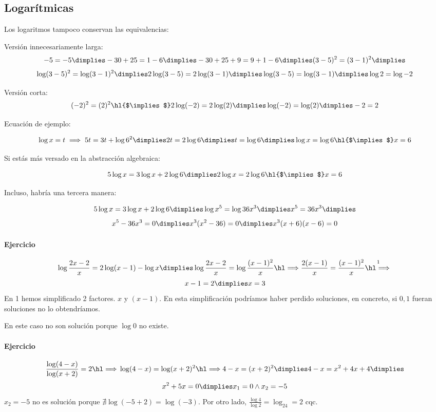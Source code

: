 \subsection{Logarítmicas}

Los logaritmos tampoco conservan las equivalencias:

Versión innecesariamente larga:
\[
	-5 = -5 \dimplies -30+25 = 1-6 \dimplies -30+25+9 = 9+1-6 \dimplies (3-5)^2 = (3-1)^2 \dimplies 
\]
\[
	\log(3-5)^2 = \log(3-1)^2 \dimplies 2\log(3-5) = 2\log(3-1) \dimplies \log(3-5)=\log(3-1) \dimplies \log2=\log-2
\]

Versión corta:
\[
	(-2)^2 = (2)^2 \text{\hl{$\implies$}} 2\log(-2) = 2\log(2) \dimplies \log(-2) = \log(2) \dimplies -2=2
\]

Ecuación de ejemplo:


\[
	\log x=t \implies 5t=3t+\log6^2 \dimplies 2t=2\log6 \dimplies t=\log6 \dimplies \log x=\log6 \text{\hl{$\implies$}} x=6
\]

Si estás más versado en la abstracción algebraica:

\[
	5\log x=3\log x+2\log 6 \dimplies 2\log x=2\log6 \text{\hl{$\implies$}} x=6
\]


Incluso, habría una tercera manera:
 
\[
	5\log x=3\log x+2\log 6 \dimplies \log x^5=\log36x^3 \dimplies x^5=36x^3 \dimplies
\]
\[
	x^5-36x^3 = 0 \dimplies x^3(x^2-36) = 0 \dimplies x^3(x+6)(x-6) = 0
\]




\paragraph{Ejercicio}
\[
	\log\frac{2x-2}{x} = 2\log(x-1)-\log x \dimplies \log \frac{2x-2}{x}=\log\frac{(x-1)^2}{x} \cimplies \frac{2(x-1)}{x} = \frac{(x-1)^2}{x} \overset{1}{\cimplies}
	\]
	\[ 
	x-1=2 \dimplies x=3
\]
En 1 hemos simplificado 2 factores. $x$ y $(x-1)$. En esta simplificación podríamos haber perdido soluciones, en concreto, si $0,1$ fueran soluciones no lo obtendríamos. 

En este caso no son solución porque $\log 0$ no existe.

\paragraph{Ejercicio}
\[
\frac{\log (4-x)}{\log(x+2)}=2 \cimplies \log(4-x) = \log(x+2)^2 \cimplies 4-x=(x+2)^2 \dimplies 4-x=x^2+4x+4 \dimplies
	\]
	\[ x^2+5x=0 \dimplies x_1=0 \wedge x_2=-5
\]
$x_2=-5$ no es solución porque $\nexists\log(-5+2)=\log(-3)$. Por otro lado, $\frac{\log4}{\log2} = \log_24=2$ cqc.



